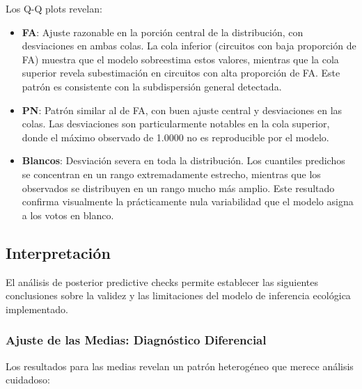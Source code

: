 Los Q-Q plots revelan:
\begin{itemize}
    \item \textbf{FA}: Ajuste razonable en la porci\'on central de la distribuci\'on, con desviaciones en ambas colas. La cola inferior (circuitos con baja proporci\'on de FA) muestra que el modelo sobreestima estos valores, mientras que la cola superior revela subestimaci\'on en circuitos con alta proporci\'on de FA. Este patr\'on es consistente con la subdispersi\'on general detectada.

    \item \textbf{PN}: Patr\'on similar al de FA, con buen ajuste central y desviaciones en las colas. Las desviaciones son particularmente notables en la cola superior, donde el m\'aximo observado de 1.0000 no es reproducible por el modelo.

    \item \textbf{Blancos}: Desviaci\'on severa en toda la distribuci\'on. Los cuantiles predichos se concentran en un rango extremadamente estrecho, mientras que los observados se distribuyen en un rango mucho m\'as amplio. Este resultado confirma visualmente la pr\'acticamente nula variabilidad que el modelo asigna a los votos en blanco.
\end{itemize}

\subsection{Interpretaci\'on}
\label{subsec:ppc_interpretacion}

El an\'alisis de posterior predictive checks permite establecer las siguientes conclusiones sobre la validez y las limitaciones del modelo de inferencia ecol\'ogica implementado.

\subsubsection{Ajuste de las Medias: Diagn\'ostico Diferencial}

Los resultados para las medias revelan un patr\'on heterog\'eneo que merece an\'alisis cuidadoso:

